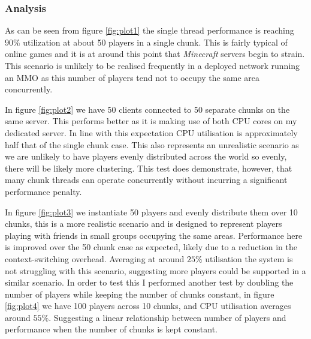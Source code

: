 \documentclass[12pt,notitlepage,a4paper]{report}
\begin{document}
	\subsubsection{Analysis}
	As can be seen from figure \ref{fig:plot1} the single thread performance is reaching $90\%$ utilization at about 50 players in a single chunk. This is fairly typical of online games and it is at around this point that \emph{Minecraft} servers begin to strain. This scenario is unlikely to be realised frequently in a deployed network running an MMO as this number of players tend not to occupy the same area concurrently.
	
	In figure \ref{fig:plot2} we have 50 clients connected to 50 separate chunks on the same server. This performs better as it is making use of both CPU cores on my dedicated server. In line with this expectation CPU utilisation is approximately half that of the single chunk case. This also represents an unrealistic scenario as we are unlikely to have players evenly distributed across the world so evenly, there will be likely more clustering. This test does demonstrate, however, that many chunk threads can operate concurrently without incurring a significant performance penalty.
	
	In figure \ref{fig:plot3} we instantiate 50 players and evenly distribute them over 10 chunks, this is a more realistic scenario and is designed to represent players playing with friends in small groups occupying the same areas. Performance here is improved over the 50 chunk case as expected, likely due to a reduction in the context-switching overhead. Averaging at around $25\%$ utilisation the system is not struggling with this scenario, suggesting more players could be supported in a similar scenario. In order to test this I performed another test by doubling the number of players while keeping the number of chunks constant, in figure \ref{fig:plot4} we have 100 players across 10 chunks, and CPU utilisation averages around $55\%$. Suggesting a linear relationship between number of players and performance when the number of chunks is kept constant.
	
\end{document}
